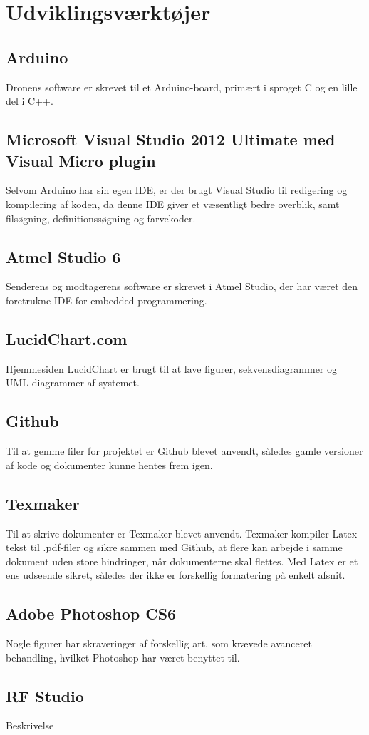 \documentclass[Main]{subfiles}
\begin{document}
\section{Udviklingsværktøjer}

\subsection{Arduino}
Dronens software er skrevet til et Arduino-board, primært i sproget C og en lille del i C++.

\subsection{Microsoft Visual Studio 2012 Ultimate med Visual Micro plugin}
Selvom Arduino har sin egen IDE, er der brugt Visual Studio til redigering og kompilering af koden, da denne IDE giver et væsentligt bedre overblik, samt filsøgning, definitionssøgning og farvekoder.

\subsection{Atmel Studio 6}
Senderens og modtagerens software er skrevet i Atmel Studio, der har været den foretrukne IDE for embedded programmering.

\subsection{LucidChart.com}
Hjemmesiden LucidChart er brugt til at lave figurer, sekvensdiagrammer og UML-diagrammer af systemet.

\subsection{Github}
Til at gemme filer for projektet er Github blevet anvendt, således gamle versioner af kode og dokumenter kunne hentes frem igen.

\subsection{Texmaker}
Til at skrive dokumenter er Texmaker blevet anvendt.
Texmaker kompiler Latex-tekst til .pdf-filer og sikre sammen med Github, at flere kan arbejde i samme dokument uden store hindringer, når dokumenterne skal flettes.
Med Latex er et ens udseende sikret, således der ikke er forskellig formatering på enkelt afsnit.

\subsection{Adobe Photoshop CS6}
Nogle figurer har skraveringer af forskellig art, som krævede avanceret behandling, hvilket Photoshop har været benyttet til.

\subsection{RF Studio}
Beskrivelse
\end{document}
